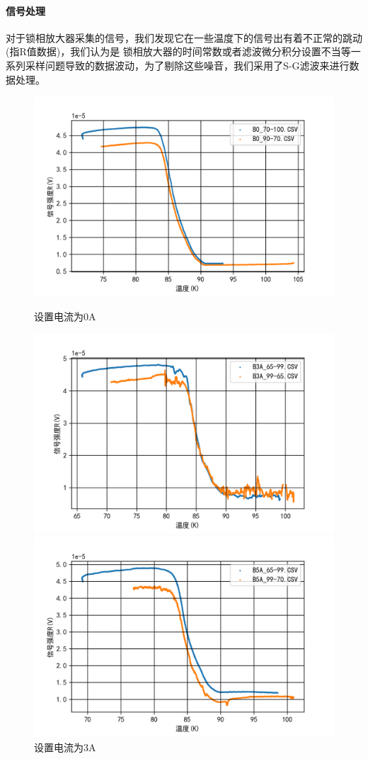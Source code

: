 \documentclass{ctexart}
\theoremstyle{ansstyle}
\begin{document}
\paragraph{信号处理} 对于锁相放大器采集的信号，我们发现它在一些温度下的信号出有着不正常的跳动(指R值数据)，我们认为是
锁相放大器的时间常数或者滤波微分积分设置不当等一系列采样问题导致的数据波动，为了剔除这些噪音，我们采用了S-G滤波来进行数据处理。
\begin{figure}[H]
	\centering
		\begin{minipage}[t]{0.48\linewidth}
			\centering
			\includegraphics[width=0.9\linewidth]{./png/2.png}
			\caption{设置电流为0A}
		\end{minipage}
		\begin{minipage}[t]{0.48\linewidth}
			\centering
			\includegraphics[width=0.9\linewidth]{./png/6.png}
			\caption{设置电流为3A}
		\end{minipage}
		\quad
		\begin{minipage}[t]{0.6\linewidth}
			\centering
			\includegraphics[width=0.9\linewidth]{./png/8.png}

\end{minipage}
\end{figure}
\end{document}
